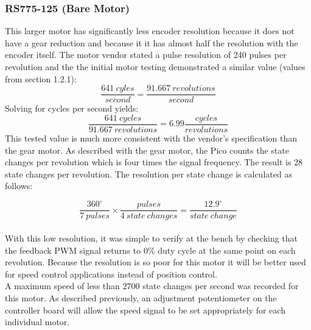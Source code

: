 \documentclass[main.tex]{subfiles}
\begin{document}
\subsubsection{RS775-125 (Bare Motor)}
This larger motor has significantly less encoder resolution because it does not have a gear reduction and because it it has almost half the resolution with the encoder itself. The motor vendor stated a pulse resolution of 240 pulses per revolution and the the initial motor testing demonstrated a similar value (values from section 1.2.1):
$$\frac{641\ cyles}{second}=\frac{91.667\  revolutions}{second}$$
Solving for cycles per second yields: 
$$\frac{641\ cycles}{91.667\ revolutions}=6.99\frac{cycles}{revolutions}$$
This tested value is much more consistent with the vendor’s specification than the gear motor. As described with the gear motor, the Pico counts the state changes per revolution which is four times the signal frequency. The result is 28 state changes per revolution. The resolution per state change is calculated as follows:

$$\frac{360^{\circ}}{7\ pulses}\times\frac{pulses}{4\ state\ changes}=\frac{12.9^{\circ}}{state\ change}$$\\

\noindent With this low resolution, it was simple to verify at the bench by checking that the feedback PWM signal returns to 0\% duty cycle at the same point on each revolution. Because the resolution is so poor for this motor it will be better used for speed control applications instead of position control.\\

\noindent A maximum speed of less than 2700 state changes per second was recorded for this motor. As described previously, an adjustment potentiometer on the controller board will allow the speed signal to be set appropriately for each individual motor.
\end{document}
